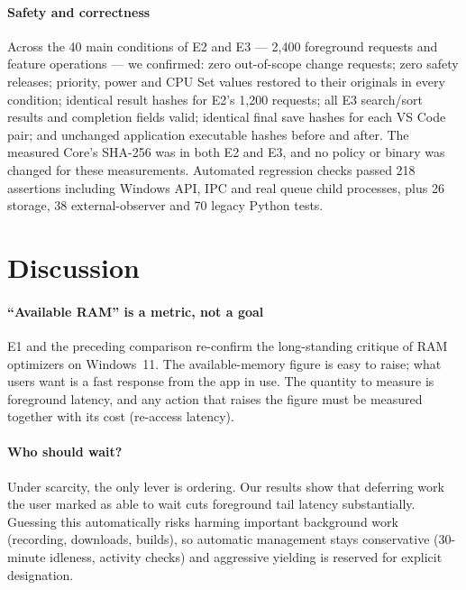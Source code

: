 \documentclass[11pt]{article}
\begin{document}
\paragraph{Safety and correctness}
Across the 40 main conditions of E2 and E3 --- 2{,}400 foreground requests and feature operations --- we confirmed: zero out-of-scope change requests; zero safety releases; priority, power and CPU Set values restored to their originals in every condition; identical result hashes for E2's 1{,}200 requests; all E3 search/sort results and completion fields valid; identical final save hashes for each VS Code pair; and unchanged application executable hashes before and after. The measured Core's SHA-256 was  in both E2 and E3, and no policy or binary was changed for these measurements. Automated regression checks passed 218 assertions including Windows API, IPC and real queue child processes, plus 26 storage, 38 external-observer and 70 legacy Python tests.


\section{Discussion}
\label{sec:discussion}

\paragraph{``Available RAM'' is a metric, not a goal}
E1 and the preceding comparison re-confirm the long-standing critique of RAM optimizers\citep{russinovich2004} on Windows~11. The available-memory figure is easy to raise; what users want is a fast response from the app in use. The quantity to measure is foreground latency, and any action that raises the figure must be measured together with its cost (re-access latency).

\paragraph{Who should wait?}
Under scarcity, the only lever is ordering. Our results show that deferring work the user marked as able to wait cuts foreground tail latency substantially. Guessing this automatically risks harming important background work (recording, downloads, builds), so automatic management stays conservative (30-minute idleness, activity checks) and aggressive yielding is reserved for explicit designation.
\end{document}
